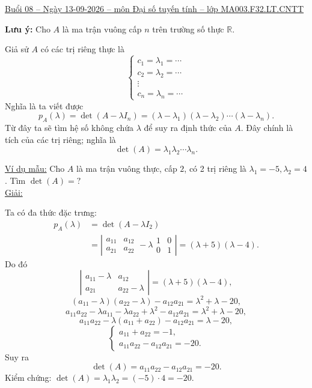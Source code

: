 \documentclass[12pt,a4paper]{article}
\newcommand{\R}{\mathbb{R}}
\begin{document}
\begin{center}
{\large\underline{Buổi 08 -- Ngày 13-09-2026 -- môn Đại số tuyến tính -- lớp MA003.F32.LT.CNTT}}
\end{center}

\textbf{Lưu ý:}
Cho $A$ là ma trận vuông cấp $n$ trên trường số thực $\R$.

Giả sử $A$ có các trị riêng thực là
\[
\begin{cases}
c_1=\lambda_1=\cdots\\
c_2=\lambda_2=\cdots\\
\vdots\\
c_n=\lambda_n=\cdots
\end{cases}
\]
Nghĩa là ta viết được
\[
p_A(\lambda)=\det(A-\lambda I_n)=(\lambda-\lambda_1)(\lambda-\lambda_2)\cdots(\lambda-\lambda_n).
\]
Từ đây ta sẽ tìm hệ số không chứa $\lambda$ để suy ra định thức của $A$.
Đây chính là tích của các trị riêng; nghĩa là
\[
\det(A)=\lambda_1\lambda_2\cdots\lambda_n.
\]

\underline{Ví dụ mẫu:} Cho $A$ là ma trận vuông thực, cấp $2$, có 2 trị riêng là $\lambda_1=-5,\lambda_2=4$. Tìm $\det(A)=?$\\
\underline{Giải:}

Ta có đa thức đặc trưng:
\[
\begin{aligned}
p_A(\lambda)&=\det(A-\lambda I_2)\\
&=\left|\begin{matrix}a_{11}&a_{12}\\a_{21}&a_{22}\end{matrix}
-\lambda\begin{matrix}1&0\\0&1\end{matrix}\right|
=(\lambda+5)(\lambda-4).
\end{aligned}
\]
Do đó
\[
\left|\begin{matrix}a_{11}-\lambda&a_{12}\\a_{21}&a_{22}-\lambda\end{matrix}\right|
=(\lambda+5)(\lambda-4),
\]
\[
(a_{11}-\lambda)(a_{22}-\lambda)-a_{12}a_{21}=\lambda^2+\lambda-20,
\]
\[
a_{11}a_{22}-\lambda a_{11}-\lambda a_{22}+\lambda^2-a_{12}a_{21}
=\lambda^2+\lambda-20,
\]
\[
a_{11}a_{22}-\lambda(a_{11}+a_{22})-a_{12}a_{21}=\lambda-20,
\]
\[
\begin{cases}
a_{11}+a_{22}=-1,\\
a_{11}a_{22}-a_{12}a_{21}=-20.
\end{cases}
\]
Suy ra
\[
\det(A)=a_{11}a_{22}-a_{12}a_{21}=-20.
\]
Kiểm chứng: $\det(A)=\lambda_1\lambda_2=(-5)\cdot4=-20$.
\end{document}
